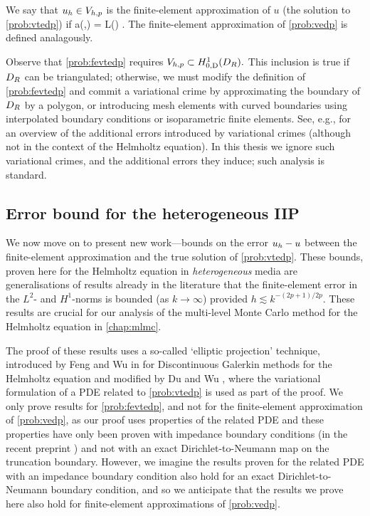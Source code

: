     \label{prob:fevtedp}
We say that $u_{h} \in V_{h,p}$ is the finite-element approximation of $u$ (the solution to \cref{prob:vtedp}) if
    \beqs
    a(\uh,\vh) = L(\vh) \tforall \vh \in \Vhp.
    \eeqs
    The finite-element approximation of \cref{prob:vedp} is defined analagously.
    \eprob

    Observe that \cref{prob:fevtedp} requires $\Vhp \subset \HozDDR.$ This inclusion is true if $D_{R}$ can be triangulated; otherwise, we must modify the definition of \cref{prob:fevtedp} and commit a variational crime by approximating the boundary of $D_{R}$ by a polygon, or introducing mesh elements with curved boundaries using interpolated boundary conditions or isoparametric finite elements. See, e.g., \cite[Chapter 10]{BrSc:08} for an overview of the additional errors introduced by variational crimes (although not in the context of the Helmholtz equation). In this thesis we  ignore such variational crimes, and the additional errors they induce; such analysis is standard.
    \ere
    

    \subsection{Error bound for the heterogeneous IIP}\label{sec:errbound}

    We now move on to present new work---bounds on the error $u_{h}-u$ between the finite-element approximation and the true solution of \cref{prob:vtedp}. These bounds, proven here for the Helmholtz equation in \emph{heterogeneous} media are generalisations of results already in the literature that the finite-element error in the $L^2$- and $H^1$-norms is bounded (as $k\rightarrow \infty$) provided $h \lesssim k^{-(2p+1)/2p}$. These results are crucial for our analysis of the multi-level Monte Carlo method for the Helmholtz equation in \cref{chap:mlmc}.

The proof of these results uses a so-called `elliptic projection' technique, introduced by Feng and Wu in \cite{FeWu:09} for Discontinuous Galerkin methods for the Helmholtz equation and modified by Du and Wu \cite{DuWu:15}, where the variational formulation of a PDE related to \cref{prob:vtedp} is used as part of the proof. We  only prove results for \cref{prob:fevtedp}, and not for the finite-element approximation of \cref{prob:vedp}, as our proof uses properties of the related PDE and these properties have only been proven with impedance boundary conditions (in the recent preprint \cite{ChNiTo:18}) and not with an exact Dirichlet-to-Neumann map on the truncation boundary. However, we imagine the results proven for the related PDE with an impedance boundary condition also hold for an exact Dirichlet-to-Neumann boundary condition, and so we anticipate that the results we prove here also hold for finite-element approximations of \cref{prob:vedp}.

